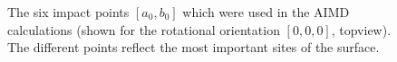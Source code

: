 \documentclass[11pt,DIV=13,BCOR=5mm,a4paper,headinclude]{scrbook}
\begin{document}
\begin{figure}[h!]
        \quad
        \quad
 \caption{The six impact points $[a_0,b_0]$ which were used in the AIMD calculations (shown for the rotational orientation $[0,0,0]$, topview). The different points reflect the most important sites of the surface. 
}
        \label{abb:impact_points}
 \end{figure}
 
\end{document}
